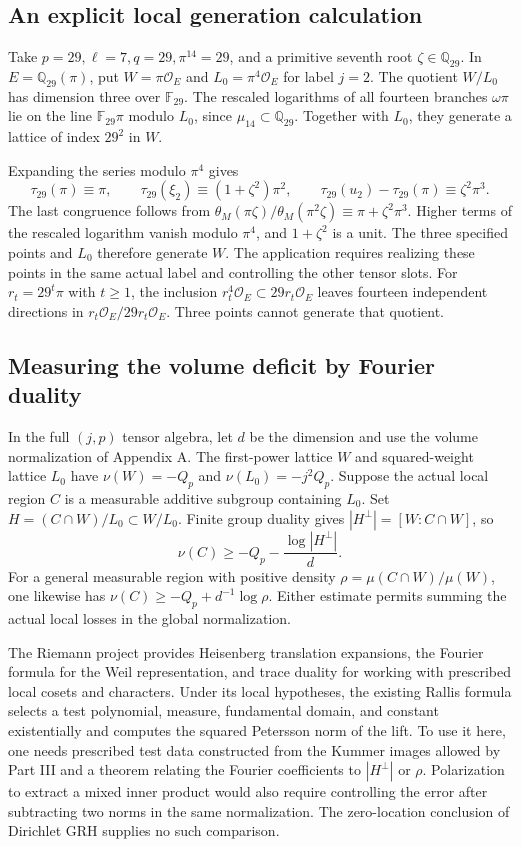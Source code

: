 \documentclass[UTF8,fontset=none,zihao=-4,a4paper]{ctexart}
\newcommand{\OO}{\mathcal O}
\newcommand{\Q}{\mathbb Q}
\begin{document}
\subsection{An explicit local generation calculation}
Take \(p=29,\ell=7,q=29,\pi^{14}=29\), and a primitive seventh root \(\zeta\in\Q_{29}\). In \(E=\Q_{29}(\pi)\), put \(W=\pi\OO_E\) and \(L_0=\pi^4\OO_E\) for label \(j=2\). The quotient \(W/L_0\) has dimension three over \(\mathbb F_{29}\). The rescaled logarithms of all fourteen branches \(\omega\pi\) lie on the line \(\mathbb F_{29}\pi\) modulo \(L_0\), since \(\mu_{14}\subset\Q_{29}\). Together with \(L_0\), they generate a lattice of index \(29^2\) in \(W\).

Expanding the series modulo \(\pi^4\) gives
\[
 \tau_{29}(\pi)\equiv\pi,\qquad
 \tau_{29}(\xi_2)\equiv(1+\zeta^2)\pi^2,\qquad
 \tau_{29}(u_2)-\tau_{29}(\pi)\equiv\zeta^2\pi^3.
\]
The last congruence follows from \(\theta_M(\pi\zeta)/\theta_M(\pi^2\zeta)\equiv\pi+\zeta^2\pi^3\). Higher terms of the rescaled logarithm vanish modulo \(\pi^4\), and \(1+\zeta^2\) is a unit. The three specified points and \(L_0\) therefore generate \(W\). The application requires realizing these points in the same actual label and controlling the other tensor slots. For \(r_t=29^t\pi\) with \(t\ge1\), the inclusion \(r_t^4\OO_E\subset29r_t\OO_E\) leaves fourteen independent directions in \(r_t\OO_E/29r_t\OO_E\). Three points cannot generate that quotient.

\subsection{Measuring the volume deficit by Fourier duality}
In the full \((j,p)\) tensor algebra, let \(d\) be the dimension and use the volume normalization of Appendix A. The first-power lattice \(W\) and squared-weight lattice \(L_0\) have \(\nu(W)=-Q_p\) and \(\nu(L_0)=-j^2Q_p\). Suppose the actual local region \(C\) is a measurable additive subgroup containing \(L_0\). Set \(H=(C\cap W)/L_0\subset W/L_0\). Finite group duality gives \(|H^\perp|=[W:C\cap W]\), so
\[
 \nu(C)\ge -Q_p-\frac{\log|H^\perp|}{d}.
\]
For a general measurable region with positive density \(\rho=\mu(C\cap W)/\mu(W)\), one likewise has \(\nu(C)\ge -Q_p+d^{-1}\log\rho\). Either estimate permits summing the actual local losses in the global normalization.

The Riemann project provides Heisenberg translation expansions, the Fourier formula for the Weil representation, and trace duality for working with prescribed local cosets and characters. Under its local hypotheses, the existing Rallis formula selects a test polynomial, measure, fundamental domain, and constant existentially and computes the squared Petersson norm of the lift. To use it here, one needs prescribed test data constructed from the Kummer images allowed by Part III and a theorem relating the Fourier coefficients to \(|H^\perp|\) or \(\rho\). Polarization to extract a mixed inner product would also require controlling the error after subtracting two norms in the same normalization. The zero-location conclusion of Dirichlet GRH supplies no such comparison.\cite{riemtheta}
\end{document}
